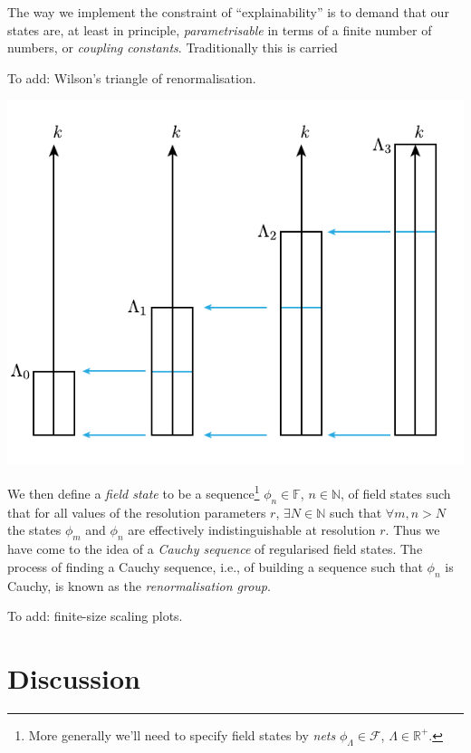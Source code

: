 \documentclass[11pt]{amsart}
\theoremstyle{plain}%
\theoremstyle{definition}
\theoremstyle{remark}
\begin{document}
The way we implement the constraint of ``explainability'' is to demand that our states are, at least in principle, \emph{parametrisable} in terms of a finite number of numbers, or \emph{coupling constants}. Traditionally this is carried 


To add: Wilson's triangle of renormalisation.

\begin{center}
\includegraphics{rginverse.pdf}
\end{center}



We then define a \emph{field state} to be a sequence\footnote{More generally we'll need to specify field states by \emph{nets} $\phi_\Lambda \in \mathcal{F}$, $\Lambda\in\mathbb{R}^+$.} $\phi_n\in\mathbb{F}$, $n\in\mathbb{N}$, of field states such that for all values of the resolution parameters $r$, $\exists N\in \mathbb{N}$ such that $\forall m,n > N$ the states $\phi_m$ and $\phi_n$ are effectively indistinguishable at resolution $r$. Thus we have come to the idea of a \emph{Cauchy sequence} of regularised field states. The process of finding a Cauchy sequence, i.e., of building a sequence such that $\phi_n$ is Cauchy, is known as the \emph{renormalisation group}.


To add: finite-size scaling plots.


\section{Discussion}\label{sec:discussion}
\end{document}
